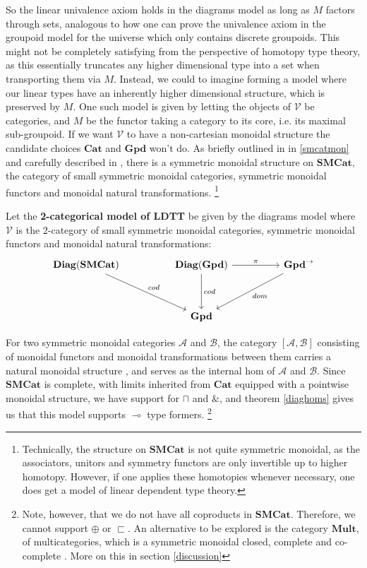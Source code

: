 \documentclass[a4paper,english]{lipics-v2018}
\DeclareMathOperator{\diag}{\mathbf{Diag}}
\begin{document}
So the linear univalence axiom holds in the diagrams model as long as $M$ factors through sets, analogous to how one can prove the univalence axiom in the groupoid model for the universe which only contains discrete groupoids. This might not be completely satisfying from the perspective of homotopy type theory, as this essentially truncates any higher dimensional type into a set when transporting them via $M$. Instead, we could to imagine forming a model where our linear types have an inherently higher dimensional structure, which is preserved by $M$. One such model is given by letting the objects of $\mathcal{V}$ be categories, and $M$ be the functor taking a category to its core, i.e. its maximal sub-groupoid. If we want $\mathcal{V}$ to have a non-cartesian monoidal structure the candidate choices $\mathbf{Cat}$ and $\mathbf{Gpd}$ won't do. As briefly outlined in in \ref{smcatmon} and carefully described in \cite{smcat}, there is a symmetric monoidal structure on $\mathbf{SMCat}$, the category of small symmetric monoidal categories, symmetric monoidal functors and monoidal natural transformations. \footnote{Technically, the structure on $\mathbf{SMCat}$ is not quite symmetric monoidal, as the associators, unitors and symmetry functors are only invertible up to higher homotopy. However, if one applies these homotopies whenever necessary, one does get a model of linear dependent type theory.}
\begin{definition}
 Let the \textbf{2-categorical model of LDTT} be given by the diagrams model where $\mathcal{V}$ is the 2-category of small symmetric monoidal categories, symmetric monoidal functors and monoidal natural transformations:
  \[
    \begin{tikzcd}[row sep=huge, column sep=huge]
    \diag(\mathbf{SMCat}) \ar[rd, "cod"] & \diag(\mathbf{Gpd}) \ar[r, "\pi"] \ar[d, "cod"] & \mathbf{Gpd}^\to \ar[ld, "dom"]\\
    & \mathbf{Gpd}
    \end{tikzcd}
  \]
\end{definition}
For two symmetric monoidal categories $\mathcal{A}$ and $\mathcal{B}$, the category $[\mathcal{A}, \mathcal{B}]$ consisting of monoidal functors and monoidal transformations between them carries a natural monoidal structure \cite{smcat}, and serves as the internal hom of $\mathcal{A}$ and $\mathcal{B}$. Since $\mathbf{SMCat}$ is complete, with limits inherited from $\mathbf{Cat}$ equipped with a pointwise monoidal structure, we have support for $\sqcap$ and $\&$, and theorem \ref{diaghoms} gives us that this model supports $\multimap$ type formers. \footnote{Note, however, that we do not have all coproducts in $\mathbf{SMCat}$. Therefore, we cannot support $\oplus$ or $\sqsubset$. An alternative to be explored is the category $\mathbf{Mult}$, of multicategories, which is a symmetric monoidal closed, complete and co-complete \cite{elmendorf2009permutative}. More on this in section \ref{discussion}}
\end{document}
